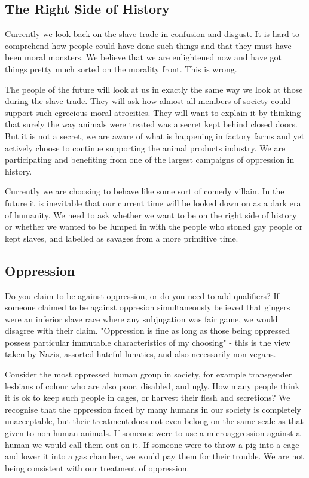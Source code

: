\subsection{The Right Side of History}

Currently we look back on the slave trade in confusion and disgust. It is hard to comprehend how people could have done such things and that they must have been moral monsters. We believe that we are enlightened now and have got things pretty much sorted on the morality front. This is wrong.

The people of the future will look at us in exactly the same way we look at those during the slave trade. They will ask how almost all members of society could support such egrecious moral atrocities. They will want to explain it by thinking that surely the way animals were treated was a secret kept behind closed doors. But it is not a secret, we are aware of what is happening in factory farms and yet actively choose to continue supporting the animal products industry. We are participating and benefiting from one of the largest campaigns of oppression in history.

Currently we are choosing to behave like some sort of comedy villain. In the future it is inevitable that our current time will be looked down on as a dark era of humanity. We need to ask whether we want to be on the right side of history or whether we wanted to be lumped in with the people who stoned gay people or kept slaves, and labelled as savages from a more primitive time.

\subsection{Oppression}

Do you claim to be against oppression, or do you need to add qualifiers? If someone claimed to be against oppresion simultaneously believed that gingers were an inferior slave race where any subjugation was fair game, we would disagree with their claim. "Oppression is fine as long as those being oppressed possess particular immutable characteristics of my choosing" - this is the view taken by Nazis, assorted hateful lunatics, and also necessarily non-vegans.

Consider the most oppressed human group in society, for example transgender lesbians of colour who are also poor, disabled, and ugly. How many people think it is ok to keep such people in cages, or harvest their flesh and secretions? We recognise that the oppression faced by many humans in our society is completely unacceptable, but their treatment does not even belong on the same scale as that given to non-human animals. If someone were to use a microaggression against a human we would call them out on it. If someone were to throw a pig into a cage and lower it into a gas chamber, we would pay them for their trouble. We are not being consistent with our treatment of oppression. 


